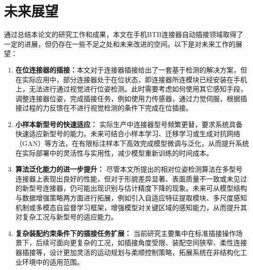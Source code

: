 \documentclass{Diploma}
\begin{document}
\section{未来展望}
通过总结本论文的研究工作和成果，本文在手机BTB连接器自动插接领域取得了一定的进展，但仍存在一些不足之处和未来改进的空间。以下是对未来工作的展望：
\begin{enumerate}
  \item \textbf{在位连接器的插接：}本文对于连接器插接给出了一套基于检测的解决方案，但在实际应用中，部分连接器处于在位状态，即连接器所连模块已经安装在手机上，无法进行通过视觉进行位姿检测。此时需要考虑如何使用其它感知手段，调整连接器位姿，完成插接任务，例如使用力传感器，通过力觉伺服，根据插接过程的力反馈在不进行视觉检测的条件下完成在位插接。
  \item \textbf{小样本新型号的快速适应：} 实际生产中连接器型号频繁更替，要求系统具备快速适应新型号的能力。未来可结合小样本学习、迁移学习或生成对抗网络（GAN）等方法，在有限标注样本下高效完成模型微调与泛化，从而提升系统在实际部署中的灵活性与实用性，减少模型重新训练的时间成本。
  \item \textbf{算法泛化能力的进一步提升：} 尽管本文所提出的相对位姿检测算法在多型号连接器上表现出良好的性能，但对于形貌差异显著、表面质量不一致或未见过的新型号连接器，仍可能出现识别与估计精度下降的现象。未来可从模型结构与数据增强策略两方面进行拓展，例如引入自适应特征提取模块、多尺度感知机制或多模态自监督学习框架，增强模型对关键区域的感知能力，从而提升其对复杂工况与新型号的适应能力。
  \item \textbf{复杂装配约束条件下的插接任务扩展：} 当前研究主要集中在标准插接操作场景下，后续可面向更复杂的工况，如插接角度受限、装配空间狭窄、柔性连接器插接等，设计更加灵活的运动规划与柔顺控制策略，拓展系统在非结构化工业环境中的适用范围。
\end{enumerate}

\StartAppendix%


\end{document}
